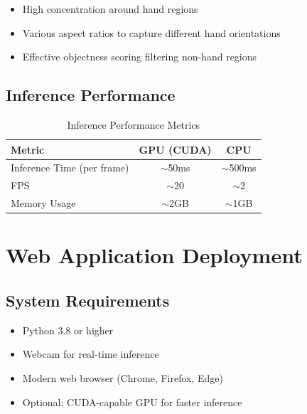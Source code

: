 \documentclass[12pt,a4paper]{article}
\begin{document}
\begin{itemize}
    \item High concentration around hand regions
    \item Various aspect ratios to capture different hand orientations
    \item Effective objectness scoring filtering non-hand regions
\end{itemize}

\subsection{Inference Performance}

\begin{table}[H]
    \centering
    \caption{Inference Performance Metrics}
    \label{tab:inference_perf}
    \begin{tabular}{|l|c|c|}
        \hline
        \textbf{Metric} & \textbf{GPU (CUDA)} & \textbf{CPU} \\
        \hline
        Inference Time (per frame) & $\sim$50ms & $\sim$500ms \\
        FPS & $\sim$20 & $\sim$2 \\
        Memory Usage & $\sim$2GB & $\sim$1GB \\
        \hline
    \end{tabular}
\end{table}

\section{Web Application Deployment}

\subsection{System Requirements}

\begin{itemize}
    \item Python 3.8 or higher
    \item Webcam for real-time inference
    \item Modern web browser (Chrome, Firefox, Edge)
    \item Optional: CUDA-capable GPU for faster inference
\end{itemize}
\end{document}
